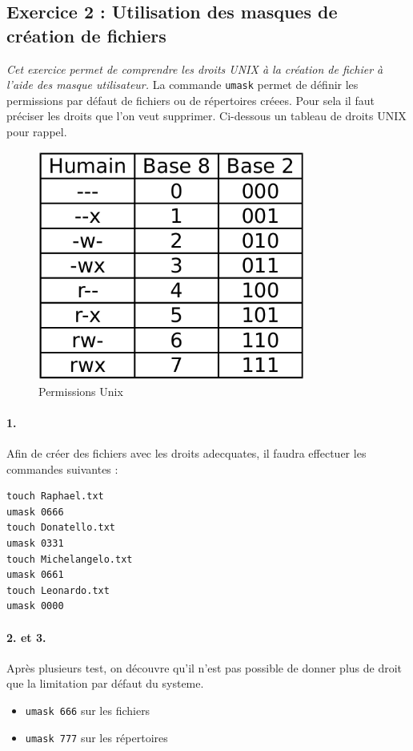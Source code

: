 \subsection{Exercice 2 : Utilisation des masques de création de fichiers}
\textit{Cet exercice permet de comprendre les droits UNIX à la création de fichier à l'aide des masque utilisateur.}
La commande \texttt{umask} permet de définir les permissions par défaut de fichiers ou de répertoires  créees. Pour sela il faut préciser les droits que l'on veut supprimer.
Ci-dessous un tableau de droits UNIX pour rappel.

\begin{figure}[!h]
\centering
\includegraphics[width=250pt]{./shell/Pictures/permissions}
\caption{Permissions Unix}
\label{Permissions Unix}
\end{figure}

\paragraph{1.}
Afin de créer des fichiers avec les droits adecquates, il faudra effectuer les commandes suivantes :
\begin{verbatim}
touch Raphael.txt
umask 0666
touch Donatello.txt
umask 0331
touch Michelangelo.txt
umask 0661
touch Leonardo.txt
umask 0000
\end{verbatim}

\paragraph{2. et 3.}
Après plusieurs test, on découvre qu'il n'est pas possible de donner plus de droit que la limitation par défaut du systeme.
\begin{itemize}
\item \texttt{umask 666} sur les fichiers
\item \texttt{umask 777} sur les répertoires
\end{itemize}

